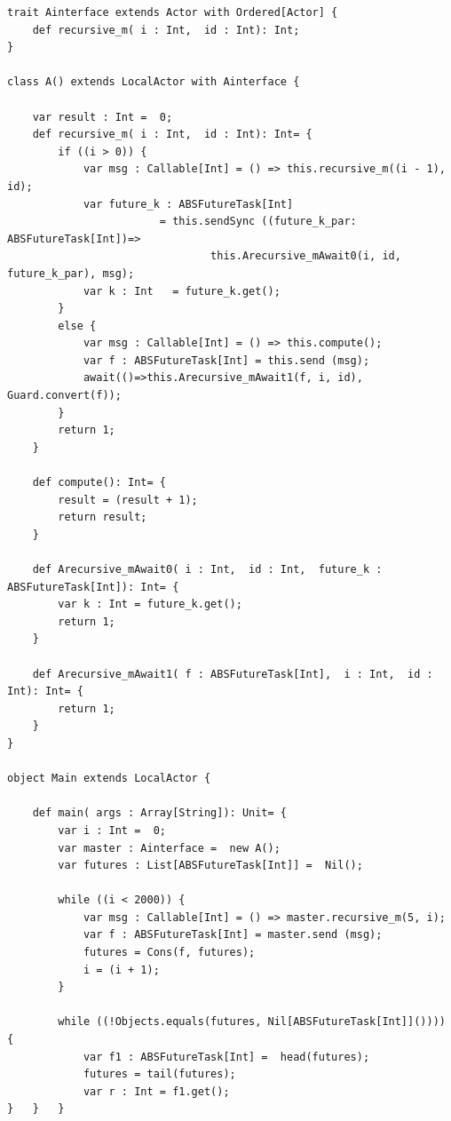 \begin{lstlisting}[caption= Benchmark Example, label=scalaex]
trait Ainterface extends Actor with Ordered[Actor] {
	def recursive_m( i : Int,  id : Int): Int;
}

class A() extends LocalActor with Ainterface {

	var result : Int =  0;
	def recursive_m( i : Int,  id : Int): Int= {
		if ((i > 0)) {
			var msg : Callable[Int] = () => this.recursive_m((i - 1), id);
			var future_k : ABSFutureTask[Int]  
						= this.sendSync ((future_k_par: ABSFutureTask[Int])=>
								this.Arecursive_mAwait0(i, id, future_k_par), msg);
			var k : Int   = future_k.get();
		}
		else {
			var msg : Callable[Int] = () => this.compute();
			var f : ABSFutureTask[Int] = this.send (msg);
			await(()=>this.Arecursive_mAwait1(f, i, id), Guard.convert(f));
		}
		return 1;
	}
	
	def compute(): Int= {
		result = (result + 1);
		return result;
	}
	
	def Arecursive_mAwait0( i : Int,  id : Int,  future_k : ABSFutureTask[Int]): Int= {
		var k : Int = future_k.get();
		return 1;
	}
	
	def Arecursive_mAwait1( f : ABSFutureTask[Int],  i : Int,  id : Int): Int= {
		return 1;
	}
}

object Main extends LocalActor {

	def main( args : Array[String]): Unit= {
		var i : Int =  0;
		var master : Ainterface =  new A();
		var futures : List[ABSFutureTask[Int]] =  Nil();
		
		while ((i < 2000)) {
			var msg : Callable[Int] = () => master.recursive_m(5, i);
			var f : ABSFutureTask[Int] = master.send (msg);
			futures = Cons(f, futures);
			i = (i + 1);
		}
		
		while ((!Objects.equals(futures, Nil[ABSFutureTask[Int]]()))) {
			var f1 : ABSFutureTask[Int] =  head(futures);
			futures = tail(futures);
			var r : Int = f1.get();
}	}	}
\end{lstlisting}

